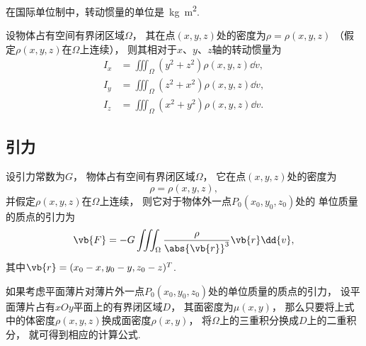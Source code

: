 在国际单位制中，转动惯量的单位是~\unit{\kilo\gram.\square\meter}.

\begin{theorem}
设物体占有空间有界闭区域\(\Omega\)，
其在点\((x,y,z)\)处的密度为\(\rho=\rho(x,y,z)\)
（假定\(\rho(x,y,z)\)在\(\Omega\)上连续），
则其相对于\(x\)、\(y\)、\(z\)轴的转动惯量为\begin{align}
	I_x &= \iiint_\Omega (y^2+z^2) \rho(x,y,z) \dd{v}, \\
	I_y &= \iiint_\Omega (z^2+x^2) \rho(x,y,z) \dd{v}, \\
	I_z &= \iiint_\Omega (x^2+y^2) \rho(x,y,z) \dd{v}.
\end{align}
\end{theorem}

\subsection{引力}
\begin{theorem}
设引力常数为\(G\)，
物体占有空间有界闭区域\(\Omega\)，
它在点\((x,y,z)\)处的密度为\begin{equation*}
	\rho=\rho(x,y,z),
\end{equation*}
并假定\(\rho(x,y,z)\)在\(\Omega\)上连续，
则它对于物体外一点\(P_0(x_0,y_0,z_0)\)处的
单位质量的质点的引力为\begin{equation}
	\vb{F}
	= -G \iiint_\Omega \frac{\rho}{\abs{\vb{r}}^3} \vb{r} \dd{v},
\end{equation}
其中\(\vb{r}
= (x_0-x,y_0-y,z_0-z)^T\).
\end{theorem}

如果考虑平面薄片对薄片外一点\(P_0(x_0,y_0,z_0)\)处的单位质量的质点的引力，
设平面薄片占有\(xOy\)平面上的有界闭区域\(D\)，
其面密度为\(\mu(x,y)\)，
那么只要将上式中的体密度\(\rho(x,y,z)\)换成面密度\(\rho(x,y)\)，
将\(\Omega\)上的三重积分换成\(D\)上的二重积分，
就可得到相应的计算公式.
